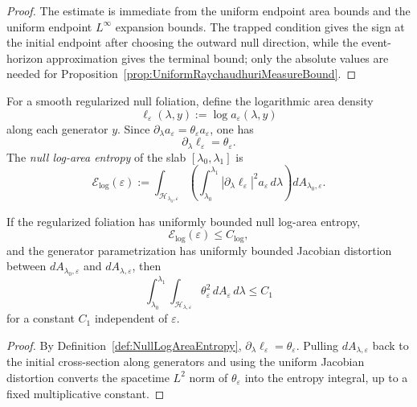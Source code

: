 \begin{proof}
The estimate is immediate from the uniform endpoint area bounds and the uniform endpoint $L^\infty$ expansion bounds. The trapped condition gives the sign at the initial endpoint after choosing the outward null direction, while the event-horizon approximation gives the terminal bound; only the absolute values are needed for Proposition~\ref{prop:UniformRaychaudhuriMeasureBound}.
\end{proof}

\begin{definition}\label{def:NullLogAreaEntropy}
For a smooth regularized null foliation, define the logarithmic area density
\[
    \ell_\varepsilon(\lambda,y):=\log a_\varepsilon(\lambda,y)
\]
along each generator $y$. Since $\partial_\lambda a_\varepsilon=\theta_\varepsilon a_\varepsilon$, one has
\[
    \partial_\lambda\ell_\varepsilon=\theta_\varepsilon .
\]
The \emph{null log-area entropy} of the slab $[\lambda_0,\lambda_1]$ is
\[
    \mathcal E_{\log}(\varepsilon)
    :=
    \int_{\mathcal H_{\lambda_0,\varepsilon}}
    \left(
        \int_{\lambda_0}^{\lambda_1}
        |\partial_\lambda\ell_\varepsilon|^2
        a_\varepsilon\,d\lambda
    \right)dA_{\lambda_0,\varepsilon}.
\]
\end{definition}

\begin{proposition}\label{prop:ExpansionSquareFromEntropy}
If the regularized foliation has uniformly bounded null log-area entropy,
\[
    \mathcal E_{\log}(\varepsilon)\le C_{\log},
\]
and the generator parametrization has uniformly bounded Jacobian distortion between $dA_{\lambda_0,\varepsilon}$ and $dA_{\lambda,\varepsilon}$, then
\[
    \int_{\lambda_0}^{\lambda_1}
    \int_{\mathcal H_{\lambda,\varepsilon}}
    \theta_\varepsilon^2\,dA_\varepsilon\,d\lambda
    \le C_1
\]
for a constant $C_1$ independent of $\varepsilon$.
\end{proposition}

\begin{proof}
By Definition~\ref{def:NullLogAreaEntropy}, $\partial_\lambda\ell_\varepsilon=\theta_\varepsilon$. Pulling $dA_{\lambda,\varepsilon}$ back to the initial cross-section along generators and using the uniform Jacobian distortion converts the spacetime $L^2$ norm of $\theta_\varepsilon$ into the entropy integral, up to a fixed multiplicative constant.
\end{proof}

